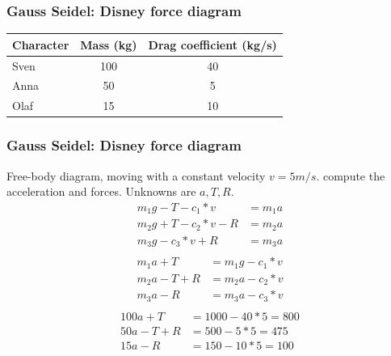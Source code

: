 \documentclass[notes]{beamer}
\begin{document}
\begin{frame}
	\frametitle{Gauss Seidel: Disney force diagram}
	\begin{table}[]
		\begin{tabular}{lcc}
			\toprule
			\textbf{Character} & \textbf{Mass (kg)} & \textbf{Drag coefficient (kg/s)} \\
			\midrule
			Sven               & 100                & 40                               \\
			Anna               & 50                 & 5                                \\
			Olaf               & 15                 & 10                               \\
			\bottomrule
		\end{tabular}
	\end{table}
\end{frame}

\begin{frame}
	\frametitle{Gauss Seidel: Disney force diagram}
	Free-body diagram, moving with a constant velocity $v = 5 m/s$. compute the acceleration and forces. Unknowns are $a, T, R$.
	\begin{align*}
		m_1 g - T - c_1 * v & = m_1 a \\
		m_2 g + T - c_2 * v - R &= m_2 a \\
		m_3 g     - c_3 * v + R & = m_3 a \\
	\end{align*}
	\begin{align*}
	m_1 a + T & = m_1 g - c_1 * v \\
	m_2 a - T + R &= m_2 a - c_2 * v \\
	m_3 a     - R & = m_3 a - c_3 * v \\
	\end{align*}
	\begin{align*}
		100 a + T & = 1000 - 40 * 5 = 800\\
		50 a - T + R &= 500 - 5 * 5  = 475\\
		15 a     - R & = 150 - 10 * 5 = 100 \\
	\end{align*}
\end{frame}
\end{document}
